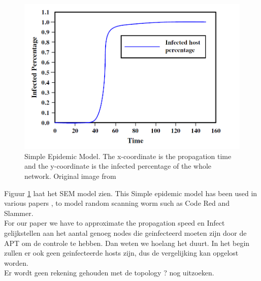 \begin{figure}[hbtp]
\centering
\includegraphics[scale=0.5]{Images/SEMmodel.png}
\caption{Simple Epidemic Model. The x-coordinate is the propagation time and the y-coordinate is the infected percentage of the whole network. Original image from \cite{OnWorms2005survey}}
\label{SEMmodel}
\end{figure}

Figuur \ref{SEMmodel} laat het SEM model zien.
This Simple epidemic model has been used in various papers \cite{OwnInternetSI}, \cite{CodeRed} to model random scanning worm such as Code Red and Slammer. \\
For our paper we have to approximate the propagation speed en Infect gelijkstellen aan het aantal genoeg nodes die geinfecteerd moeten zijn door de APT om de controle te hebben. Dan weten we hoelang het duurt. In het begin zullen er ook geen geinfecteerde hosts zijn, dus de vergelijking kan opgelost worden.\\
Er wordt geen rekening gehouden met de topology ? nog uitzoeken.
